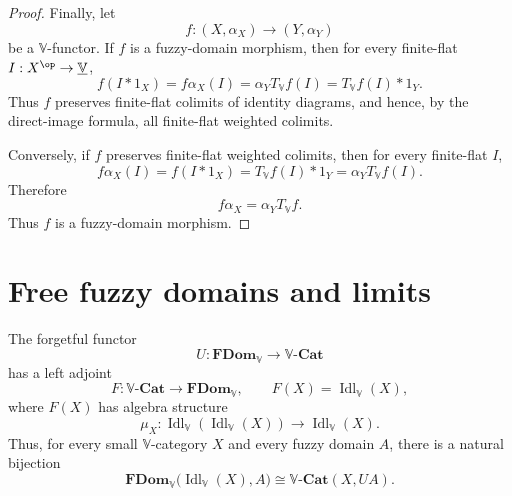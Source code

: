 \begin{proof}
Finally, let
\[
    f:(X,\alpha_X)\to(Y,\alpha_Y)
\]
be a \(\mathbb V\)-functor.  If \(f\) is a fuzzy-domain morphism, then for every
finite-flat \(I:X^{\op}\to\underline{\mathbb V}\),
\[
    f(I*1_X)
    =
    f\alpha_X(I)
    =
    \alpha_YT_{\mathbb V}f(I)
    =
    T_{\mathbb V}f(I)*1_Y.
\]
Thus \(f\) preserves finite-flat colimits of identity diagrams, and hence, by
the direct-image formula, all finite-flat weighted colimits.

Conversely, if \(f\) preserves finite-flat weighted colimits, then for every
finite-flat \(I\),
\[
    f\alpha_X(I)
    =
    f(I*1_X)
    =
    T_{\mathbb V}f(I)*1_Y
    =
    \alpha_YT_{\mathbb V}f(I).
\]
Therefore
\[
    f\alpha_X=\alpha_YT_{\mathbb V}f.
\]
Thus \(f\) is a fuzzy-domain morphism.
\end{proof}

\section{Free fuzzy domains and limits}
\label{sec:free-fuzzy-domains-limits-rewrite}

\begin{theorem}
\label{thm:free-fuzzy-domains-rewrite}
The forgetful functor
\[
    U:\mathbf{FDom}_{\mathbb V}\to\mathbb V\text{-}\mathbf{Cat}
\]
has a left adjoint
\[
    F:\mathbb V\text{-}\mathbf{Cat}\to\mathbf{FDom}_{\mathbb V},
    \qquad
    F(X)=\operatorname{Idl}_{\mathbb V}(X),
\]
where \(F(X)\) has algebra structure
\[
    \mu_X:
    \operatorname{Idl}_{\mathbb V}(\operatorname{Idl}_{\mathbb V}(X))
    \to
    \operatorname{Idl}_{\mathbb V}(X).
\]
Thus, for every small \(\mathbb V\)-category \(X\) and every fuzzy domain \(A\),
there is a natural bijection
\[
    \mathbf{FDom}_{\mathbb V}
    \bigl(
        \operatorname{Idl}_{\mathbb V}(X),
        A
    \bigr)
    \cong
    \mathbb V\text{-}\mathbf{Cat}(X,UA).
\]
\end{theorem}

